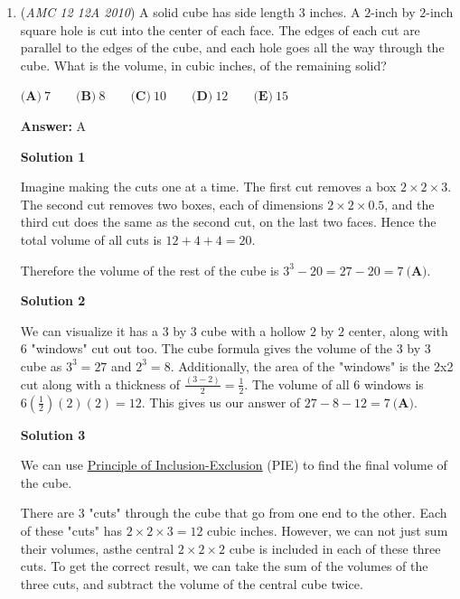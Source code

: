 \begin{enumerate}
 


	\item (\textit{AMC 12 12A 2010}) A solid cube has side length $3$ inches. A $2$-inch by $2$-inch square hole is cut into the center of each face. The edges of each cut are parallel to the edges of the cube, and each hole goes all the way through the cube. What is the volume, in cubic inches, of the remaining solid?


 $\textbf{(A)}\ 7 \qquad \textbf{(B)}\ 8 \qquad \textbf{(C)}\ 10 \qquad \textbf{(D)}\ 12 \qquad \textbf{(E)}\ 15$

 \textbf{Answer: }A



\textbf{Solution 1}

Imagine making the cuts one at a time. The first cut removes a box $2\times 2\times 3$. The second cut removes two boxes, each of dimensions $2\times 2\times 0.5$, and the third cut does the same as the second cut, on the last two faces. Hence the total volume of all cuts is $12 + 4 + 4 = 20$.

 Therefore the volume of the rest of the cube is $3^3 - 20 = 27 - 20 = \boxed{7\ \textbf{(A)}}$.

 



\textbf{Solution 2}

We can visualize it has a $3$ by $3$ cube with a hollow $2$ by $2$ center, along with 6 "windows" cut out too. The cube formula gives the volume of the $3$ by $3$ cube as $3^3 = 27$ and $2^3 = 8.$ Additionally, the area of the "windows" is the 2x2 cut along with a thickness of $\frac{(3-2)}{2} = \frac{1}{2}.$ The volume of all 6 windows is $6(\frac{1}{2})(2)(2) = 12.$ This gives us our answer of $27 - 8 - 12 = \boxed{7\ \textbf{(A)}}.$




\textbf{Solution 3}

We can use \href{https://artofproblemsolving.com/wiki/index.php?title=Principle\_of\_Inclusion-Exclusion}{Principle of Inclusion-Exclusion} (PIE) to find the final volume of the cube.

 There are 3 "cuts" through the cube that go from one end to the other. Each of these "cuts" has $2 \times 2 \times 3=12$ cubic inches. However, we can not just sum their volumes, asthe central $2\times 2\times 2$ cube is included in each of these three cuts. To get the correct result, we can take the sum of the volumes of the three cuts, and subtract the volume of the central cube twice.


\end{enumerate}
